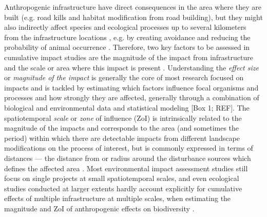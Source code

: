 \documentclass[titlepage]{article}
\begin{document}
Anthropogenic infrastructure have direct consequences in the area where they are built (e.g. road kills and habitat modification from road building), but they might also indirectly affect species and ecological processes up to several kilometers from the infrastructure locations \citep{johnson_cumulative_2005,torres_assessing_2016}, e.g. by creating avoidance and reducing the probability of animal occurrence \citep{trombulak_review_2000,harris_grappling_2011}. Therefore, two key factors to be assessed in cumulative impact studies are the magnitude of the impact from infrastructure and the scale or area where this impact is present \citep[Box 1; ][]{naugle_unifying_2011}. Understanding the \textit{effect size} or \textit{magnitude of the impact} is generally the core of most research focused on impacts and is tackled by estimating which factors influence focal organisms and processes and how strongly they are affected, generally through a combination of biological and environmental data and statistical modeling [Box 1; REF]. The spatiotemporal \textit{scale} or \textit{zone} of influence (ZoI) is intrinsically related to the magnitude of the impacts and corresponds to the area (and sometimes the period) within which there are detectable impacts from different landscape modifications on the process of interest, but is commonly expressed in terms of distances --- the distance from or radius around the disturbance sources which defines the affected area \citep[Box 1; ][]{polfus_identifying_2011, boulanger_estimating_2012}. Most environmental impact assessment studies still focus on single projects at small spatiotemporal scales, and even ecological studies conducted at larger extents hardly account explicitly for cumulative effects of multiple infrastructure at multiple scales, when estimating the magnitude and ZoI of anthropogenic effects on biodiversity \citep{johnson_regulating_2011, mcgarigal_multi-scale_2016}. 

\end{document}
